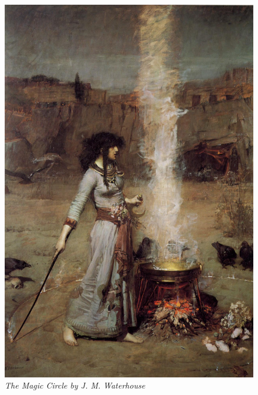 \begin{figure}[t!]
\centering

\includegraphics[width=\textwidth]{graphics/frontmatter/j_m_waterhouse_magic_circle.pdf}
\caption*{\emph{The Magic Circle by J. M. Waterhouse}}
\end{figure}
\restoregeometry